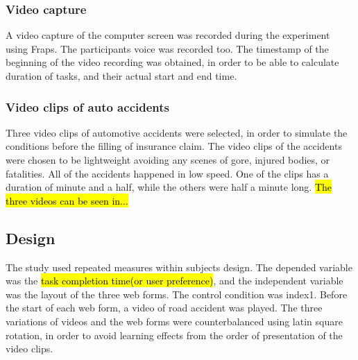 \documentclass[a4paper]{report}
\begin{document}
			\subsubsection{Video capture}
			A video capture of the computer screen was recorded during the experiment using Fraps\cite{fraps}. The participants voice was recorded too. The timestamp of the beginning of the video recording was obtained, in order to be able to calculate duration of tasks, and their actual start and end time.
			\subsubsection{Video clips of auto accidents}
			Three video clips of automotive accidents were selected, in order to simulate the conditions before the filling of insurance claim. The video clips of the accidents were chosen to be lightweight avoiding any scenes of gore, injured bodies, or fatalities. All of the accidents happened in low speed. One of the clips has a duration of minute and a half, while the others were half a minute long. \hl{The three videos can be seen in...}
		\subsection{Design}
		The study used repeated measures within subjects design. The depended variable was the \hl{task completion time(or user preference)}, and the independent variable was the layout of the three web forms. The control condition was index1. Before the start of each web form, a video of road accident was played. The three variations of videos and the web forms were counterbalanced using latin square rotation, in order to avoid learning effects from the order of presentation of the video clips.
\end{document}
